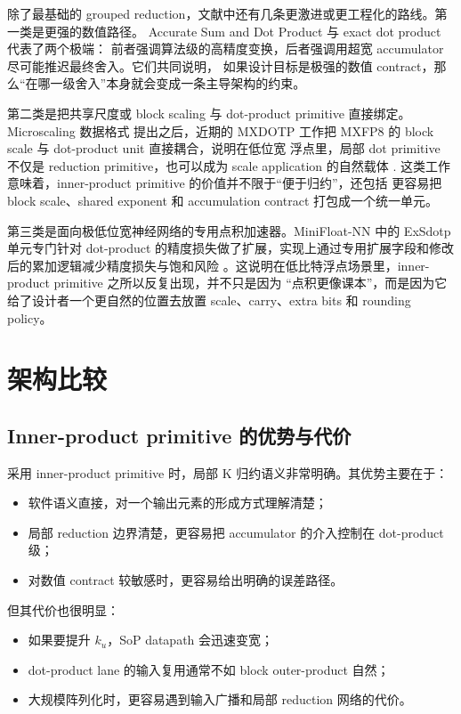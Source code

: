 \documentclass[UTF8,11pt,a4paper]{ctexart}
\newcommand{\ku}{\ensuremath{k_u}}
\begin{document}
除了最基础的 grouped reduction，文献中还有几条更激进或更工程化的路线。第一类是更强的数值路径。
Accurate Sum and Dot Product \cite{ogita2005} 与 exact dot product \cite{exactdot} 代表了两个极端：
前者强调算法级的高精度变换，后者强调用超宽 accumulator 尽可能推迟最终舍入。它们共同说明，
如果设计目标是极强的数值 contract，那么“在哪一级舍入”本身就会变成一条主导架构的约束。

第二类是把共享尺度或 block scaling 与 dot-product primitive 直接绑定。Microscaling 数据格式
提出之后，近期的 MXDOTP 工作把 MXFP8 的 block scale 与 dot-product unit 直接耦合，说明在低位宽
浮点里，局部 dot primitive 不仅是 reduction primitive，也可以成为 scale application 的自然载体
\cite{mxdotp,mx}. 这类工作意味着，inner-product primitive 的价值并不限于“便于归约”，还包括
更容易把 block scale、shared exponent 和 accumulation contract 打包成一个统一单元。

第三类是面向极低位宽神经网络的专用点积加速器。MiniFloat-NN 中的 ExSdotp 单元专门针对
dot-product 的精度损失做了扩展，实现上通过专用扩展字段和修改后的累加逻辑减少精度损失与饱和风险
\cite{exsdotp}。这说明在低比特浮点场景里，inner-product primitive 之所以反复出现，并不只是因为
“点积更像课本”，而是因为它给了设计者一个更自然的位置去放置 scale、carry、extra bits 和 rounding policy。

\section{架构比较}

\subsection{Inner-product primitive 的优势与代价}

采用 inner-product primitive 时，局部 K 归约语义非常明确。其优势主要在于：

\begin{itemize}
  \item 软件语义直接，对一个输出元素的形成方式理解清楚；
  \item 局部 reduction 边界清楚，更容易把 accumulator 的介入控制在 dot-product 级；
  \item 对数值 contract 较敏感时，更容易给出明确的误差路径。
\end{itemize}

但其代价也很明显：

\begin{itemize}
  \item 如果要提升 \ku{}，SoP datapath 会迅速变宽；
  \item dot-product lane 的输入复用通常不如 block outer-product 自然；
  \item 大规模阵列化时，更容易遇到输入广播和局部 reduction 网络的代价。
\end{itemize}
\end{document}
